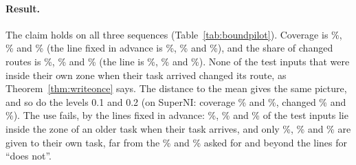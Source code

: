 \begin{table}[t]
  \caption{Zones from the inputs of a task, no instruction (routes only; $\beta = 0.05$; means over the tasks of a sequence, in \%). Covered: test inputs inside their own zone (promised at least \BoundCovPromised{}\% on average). Answers changed: test inputs whose route after the last task differs from the route when their task arrived (promised at most \BoundAlpha{}\%).
  Blocked: test inputs inside the zone of an older task when their task arrives. Own task: test inputs given to their own task after the last task. ``sentence enc.'': the frozen all-MiniLM-L6-v2 on the instance text, mean pooling. 10-NN: score is the distance to the 10th nearest fit input; mean: distance to the mean of the fit inputs; ``word-vec.'': the word-vector feature.}
  \label{tab:boundpilot}
  \centering
  \footnotesize
  \setlength{\tabcolsep}{3pt}
  
\end{table}

\paragraph{Result.} The claim holds on all three sequences (Table~\ref{tab:boundpilot}). Coverage is \BoundSuperniWordKnnFiveCov{}\%, \BoundLongWordKnnFiveCov{}\% and \BoundBothWordKnnFiveCov{}\% (the line fixed in advance is \BoundSuperniCovLimit{}\%, \BoundLongCovLimit{}\% and \BoundBothCovLimit{}\%), and the share of changed routes is \BoundSuperniWordKnnFiveChanged{}\%, \BoundLongWordKnnFiveChanged{}\% and \BoundBothWordKnnFiveChanged{}\% (the line is \BoundSuperniChangedLimit{}\%, \BoundLongChangedLimit{}\% and \BoundBothChangedLimit{}\%).
None of the test inputs that were inside their own zone when their task arrived changed its route, as Theorem~\ref{thm:writeonce} says. The distance to the mean gives the same picture, and so do the levels 0.1 and 0.2 (on SuperNI: coverage \BoundSuperniWordKnnTenCov{}\% and \BoundSuperniWordKnnTwentyCov{}\%, changed \BoundSuperniWordKnnTenChanged{}\% and \BoundSuperniWordKnnTwentyChanged{}\%).
The use fails, by the lines fixed in advance: \BoundSuperniWordKnnFiveBlocked{}\%, \BoundLongWordKnnFiveBlocked{}\% and \BoundBothWordKnnFiveBlocked{}\% of the test inputs lie inside the zone of an older task when their task arrives, and only \BoundSuperniWordKnnFiveOwn{}\%, \BoundLongWordKnnFiveOwn{}\% and \BoundBothWordKnnFiveOwn{}\% are given to their own task, far from the \BoundLineOwn{}\% and \BoundLineBlock{}\% asked for and beyond the lines for ``does not''.

